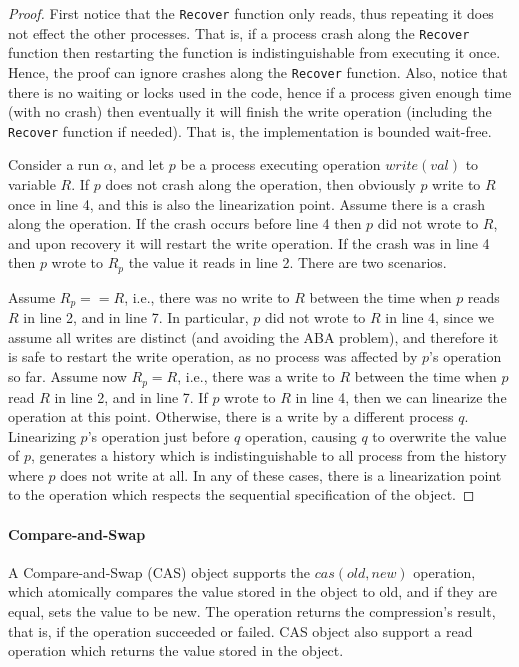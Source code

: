 \begin{proof}
	First notice that the \texttt{Recover} function only reads, thus repeating it does not effect the other processes. That is, if a process crash along the \texttt{Recover} function then restarting the function is indistinguishable from executing it once. Hence, the proof can ignore crashes along the \texttt{Recover} function. Also, notice that there is no waiting or locks used in the code, hence if a process given enough time (with no crash) then eventually it will finish the write operation (including the \texttt{Recover} function if needed). That is, the implementation is bounded wait-free.
	
	Consider a run $\alpha$, and let $p$ be a process executing operation $write(val)$ to variable $R$. If $p$ does not crash along the operation, then obviously $p$ write to $R$ once in line 4, and this is also the linearization point. Assume there is a crash along the operation. If the crash occurs before line 4 then $p$ did not wrote to $R$, and upon recovery it will restart the write operation. If the crash was in line 4 then $p$ wrote to $R_p$ the value it reads in line 2. There are two scenarios.
	
	Assume $R_p == R$, i.e., there was no write to $R$ between the time when $p$ reads $R$ in line 2, and in line 7. In particular, $p$ did not wrote to $R$ in line 4, since we assume all writes are distinct (and avoiding the ABA problem), and therefore it is safe to restart the write operation, as no process was affected by $p$'s operation so far. Assume now $R_p = R$, i.e., there was a write to $R$ between the time when $p$ read $R$ in line 2, and in line 7. If $p$ wrote to $R$ in line 4, then we can linearize the operation at this point. Otherwise, there is a write by a different process $q$. Linearizing $p$'s operation just before $q$ operation, causing $q$ to overwrite the value of $p$, generates a history which is indistinguishable to all process from the history where $p$ does not write at all. In any of these cases, there is a linearization point to the operation which respects the sequential specification of the object.
\end{proof}


\paragraph*{Compare-and-Swap}

A Compare-and-Swap (CAS) object supports the $cas(old,new)$ operation, which atomically compares the value stored in the object to old, and if they are equal, sets the value to be new. The operation returns the compression's result, that is, if the operation succeeded or failed. CAS object also support a read operation which returns the value stored in the object.

